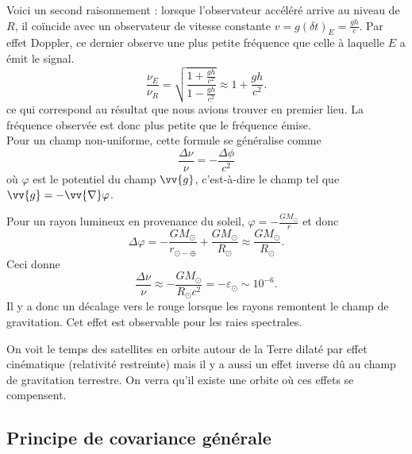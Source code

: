 \documentclass[a4paper,11pt]{report}
\begin{document}
                Voici un second raisonnement : lorsque l'observateur accéléré arrive au niveau de $R$, il coïncide avec un observateur de vitesse constante $v = g(\delta t)_E = \frac{gh}{c}$. Par effet Doppler, ce dernier observe une plus petite fréquence que celle à laquelle $E$ a émit le signal.
                \begin{equation}
                    \frac{\nu_E}{\nu_R} = \sqrt{\frac{1+\frac{gh}{c^2}}{1-\frac{gh}{c^2}}}\approx 1+\frac{gh}{c^2}.
                \end{equation}
                ce qui correspond au résultat que nous avions trouver en premier lieu. La fréquence observée est donc plus petite que le fréquence émise.\\
                Pour un champ non-uniforme, cette formule se généralise comme
                \begin{equation}
                    \frac{\Delta\nu}{\nu} = -\frac{\Delta\phi}{c^2}
                \end{equation}
                où $\varphi$ est le potentiel du champ $\vv{g}$, c'est-à-dire le champ tel que $\vv{g} = -\vv{\nabla}\varphi$.
                
                \begin{exmp}
                    Pour un rayon lumineux en provenance du soleil, $\varphi=-\frac{GM_\odot}{r}$ et donc
                    \begin{equation}
                        \Delta\varphi = -\frac{GM_\odot}{r_{\odot-\oplus}} + \frac{GM_\odot}{R_\odot}\approx\frac{GM_\odot}{R_\odot}.
                    \end{equation}
                    Ceci donne
                    \begin{equation}
                        \frac{\Delta\nu}{\nu} \approx - \frac{GM_\odot}{R_\odot c^2} = -\varepsilon_\odot \sim 10^{-6}.
                    \end{equation}
                    Il y a donc un décalage vers le rouge lorsque les rayons remontent le champ de gravitation. Cet effet est observable pour les raies spectrales.
                \end{exmp}
                
                On voit le temps des satellites en orbite autour de la Terre dilaté par effet cinématique (relativité restreinte) mais il y a aussi un effet inverse dû au champ de gravitation terrestre. On verra qu'il existe une orbite où ces effets se compensent.
    
        \subsection{Principe de covariance générale}
        
\end{document}
